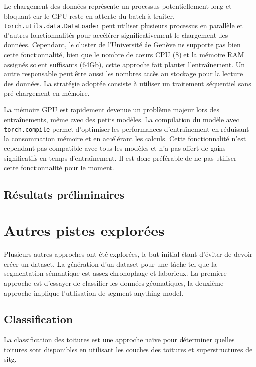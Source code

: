 Le chargement des données représente un processus potentiellement long et bloquant car le GPU reste en attente du batch à traiter. \texttt{torch.utils.data.DataLoader} peut utiliser plusieurs processus en parallèle et d'autres fonctionnalités pour accélérer significativement le chargement des données. Cependant, le cluster de l'Université de Genève ne supporte pas bien cette fonctionnalité, bien que le nombre de cœurs CPU (8) et la mémoire RAM assignés soient suffisants (64Gb), cette approche fait planter l'entraînement. Un autre responsable peut être aussi les nombres accès au stockage pour la lecture des données. La stratégie adoptée consiste à utiliser un traitement séquentiel sans pré-chargement en mémoire.

La mémoire GPU est rapidement devenue un problème majeur lors des entraînements, même avec des petits modèles. La compilation du modèle avec \texttt{torch.compile} permet d'optimiser les performances d'entraînement en réduisant la consommation mémoire et en accélérant les calculs. Cette fonctionnalité n'est cependant pas compatible avec tous les modèles et n'a pas offert de gains significatifs en temps d'entraînement. Il est donc préférable de ne pas utiliser cette fonctionnalité pour le moment.

\subsection{Résultats préliminaires}
\newpage
\section{Autres pistes explorées}
\label{sec:pistes_explorees}
Plusieurs autres approches ont été explorées, le but initial étant d'éviter de devoir créer un dataset. La génération d'un dataset pour une tâche tel que la segmentation sémantique est assez chronophage et laborieux. La première approche est d'essayer de classifier les données géomatiques, la deuxième approche implique l'utilisation de segment-anything-model.

\subsection{Classification}
La classification des toitures est une approche naïve pour déterminer quelles toitures sont disponibles en utilisant les couches des toitures et superstructures de \acrshort{sitg}.


